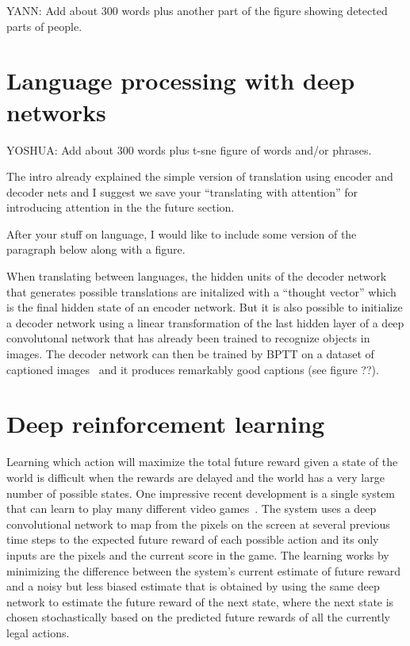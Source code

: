 \documentclass[]{article}
\begin{document}
YANN: Add about 300 words plus another part of the figure showing detected
parts of people.

\section{Language processing with deep networks}

YOSHUA: Add about 300 words plus t-sne figure of words and/or phrases.

The intro already explained the simple version of translation using encoder
and decoder nets and I suggest we save your ``translating with attention''
for introducing attention in the the future section.

After your stuff on language, I would like to include some version of the
paragraph below along with a figure.

When translating between languages, the hidden units of the decoder network
that generates possible translations are initalized with a ``thought
vector'' which is the final hidden state of an encoder network.  But it is
also possible to initialize a decoder network using a linear transformation
of the last hidden layer of a deep convolutonal network that has already
been trained to recognize objects in images. The decoder network can then
be trained by BPTT on a dataset of captioned
images~\cite{NIC,StanfordNIC,more?} and it produces remarkably good
captions (see figure ??).

\section{Deep reinforcement learning}

Learning which action will maximize the total future reward given a state
of the world is difficult when the rewards are delayed and the world has a
very large number of possible states. One impressive recent development is
a single system that can learn to play many different video
games~\cite{NatureAtari}. The system uses a deep convolutional network to
map from the pixels on the screen at several previous time steps to the
expected future reward of each possible action and its only inputs are the
pixels and the current score in the game. The learning works by minimizing
the difference between the system's current estimate of future reward and a
noisy but less biased estimate that is obtained by using the same deep
network to estimate the future reward of the next state, where the next
state is chosen stochastically based on the predicted future rewards of all
the currently legal actions.
\end{document}
